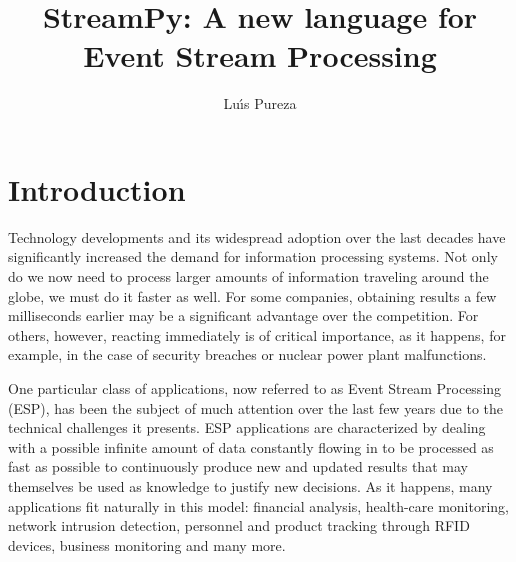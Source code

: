 \documentclass{report}
\begin{document}
\title{StreamPy: A new language for Event Stream Processing}
\author{Lu\'{\i}s Pureza}

\maketitle

\tableofcontents

\addtolength{\parskip}{\baselineskip}
\chapter{Introduction}

Technology developments and its widespread adoption over the last decades have significantly increased the demand for information processing systems. Not only do we now need to process larger amounts of information traveling around the globe, we must do it faster as well. For some companies, obtaining results a few milliseconds earlier may be a significant advantage over the competition. For others, however, reacting immediately is of critical importance, as it happens, for example, in the case of security breaches or nuclear power plant malfunctions.

One particular class of applications, now referred to as Event Stream Processing (ESP), has been the subject of much attention over the last few years due to the technical challenges it presents. ESP applications are characterized by dealing with a possible infinite amount of data constantly flowing in to be processed as fast as possible to continuously produce new and updated results that may themselves be used as knowledge to justify new decisions. As it happens, many applications fit naturally in this model: financial analysis, health-care monitoring, network intrusion detection, personnel and product tracking through RFID devices, business monitoring and many more.
\end{document}
